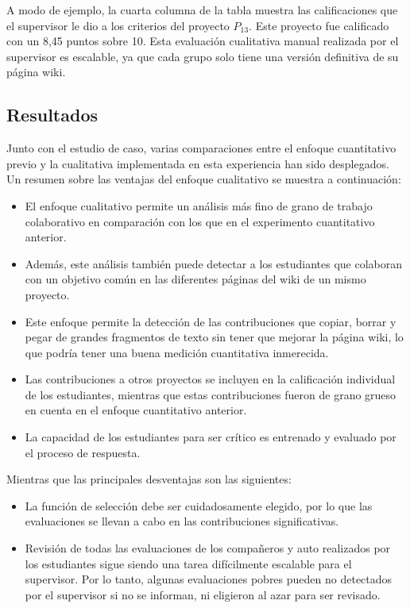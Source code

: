 A modo de ejemplo, la cuarta columna de la tabla muestra las calificaciones que el supervisor le dio a los criterios del proyecto $P_{13}$. Este proyecto fue calificado con un 8,45 puntos sobre 10. Esta evaluación cualitativa manual realizada por el supervisor es escalable, ya que cada grupo solo tiene una versión definitiva de su página wiki.

\subsection{Resultados}

Junto con el estudio de caso, varias comparaciones entre el enfoque cuantitativo previo y la cualitativa implementada en esta experiencia han sido desplegados. Un resumen sobre las ventajas del enfoque cualitativo se muestra a continuación:

\begin{itemize}
\item El enfoque cualitativo permite un análisis más fino de grano de trabajo colaborativo en comparación con los que en el experimento cuantitativo anterior.
\item Además, este análisis también puede detectar a los estudiantes que colaboran con un objetivo común en las diferentes páginas del wiki de un mismo proyecto.
\item Este enfoque permite la detección de las contribuciones que copiar, borrar y pegar de grandes fragmentos de texto sin tener que mejorar la página wiki, lo que podría tener una buena medición cuantitativa inmerecida.
\item Las contribuciones a otros proyectos se incluyen en la calificación individual de los estudiantes, mientras que estas contribuciones fueron de grano grueso en cuenta en el enfoque cuantitativo anterior.
\item La capacidad de los estudiantes para ser crítico es entrenado y evaluado por el proceso de respuesta.
\end{itemize}

Mientras que las principales desventajas son las siguientes:

\begin {itemize}
\item La función de selección debe ser cuidadosamente elegido, por lo que las evaluaciones se llevan a cabo en las contribuciones significativas.
\item Revisión de todas las evaluaciones de los compañeros y auto realizados por los estudiantes sigue siendo una tarea difícilmente escalable para el supervisor. Por lo tanto, algunas evaluaciones pobres pueden no detectados por el supervisor si no se informan, ni eligieron al azar para ser revisado.
\end {itemize}

